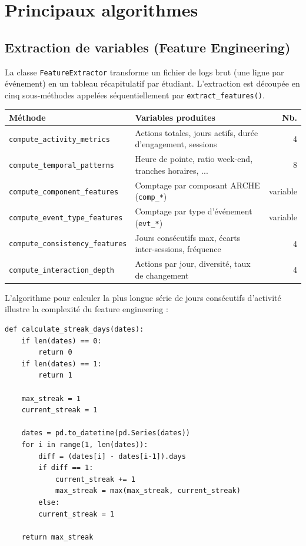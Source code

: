 \documentclass[12pt, a4paper, french]{report}
\begin{document}
\chapter{Principaux algorithmes}

\section{Extraction de variables (Feature Engineering)}

La classe \texttt{FeatureExtractor} transforme un fichier de logs brut (une ligne par événement) en un tableau récapitulatif par étudiant.
L'extraction est découpée en cinq sous-méthodes appelées séquentiellement par \texttt{extract\_features()}.

\begin{center}
\footnotesize
\begin{tabular}{lp{7cm}r}
\toprule
\textbf{Méthode} & \textbf{Variables produites} & \textbf{Nb.}\\
\midrule
\texttt{compute\_activity\_metrics}
  & Actions totales, jours actifs, durée d'engagement, sessions & 4\\
\texttt{compute\_temporal\_patterns}
  & Heure de pointe, ratio week-end, tranches horaires, ... & 8\\
\texttt{compute\_component\_features}
  & Comptage par composant ARCHE (\texttt{comp\_*}) & variable\\
\texttt{compute\_event\_type\_features}
  & Comptage par type d'événement (\texttt{evt\_*}) & variable\\
\texttt{compute\_consistency\_features}
  & Jours consécutifs max, écarts inter-sessions, fréquence & 4\\
\texttt{compute\_interaction\_depth}
  & Actions par jour, diversité, taux de changement & 4\\
\bottomrule
\end{tabular}
\end{center}

L'algorithme pour calculer la plus longue série de jours consécutifs d'activité illustre la complexité du feature engineering :

\begin{lstlisting}[caption={Calcul du plus grand nombre de jours d'activité successif}]
def calculate_streak_days(dates):
	if len(dates) == 0:
		return 0
	if len(dates) == 1:
		return 1

	max_streak = 1
	current_streak = 1

	dates = pd.to_datetime(pd.Series(dates))
	for i in range(1, len(dates)):
		diff = (dates[i] - dates[i-1]).days
		if diff == 1:
			current_streak += 1
			max_streak = max(max_streak, current_streak)
		else:
		current_streak = 1

	return max_streak
\end{lstlisting}
\end{document}

